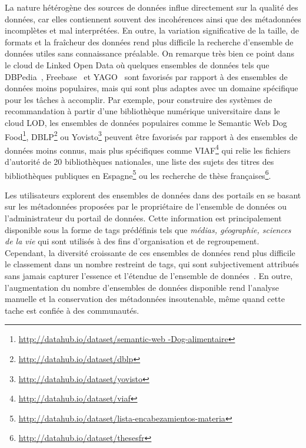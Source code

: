 La nature h\'{e}t\'{e}rog\`{e}ne des sources de donn\'{e}es influe directement sur la qualit\'{e} des donn\'{e}es, car elles contiennent souvent des incoh\'{e}rences ainsi que des m\'{e}tadonn\'{e}es incompl\`{e}tes et mal interpr\'{e}t\'{e}es. En outre, la variation significative de la taille, de formats et la fraîcheur des donn\'{e}es rend plus difficile la recherche d'ensemble de donn\'{e}es utiles sans connaissance pr\'{e}alable. On remarque tr\`{e}s bien ce point dans le cloud de Linked Open Data où quelques ensembles de donn\'{e}es tels que DBPedia~\cite{Bizer:WebSemJorunal:09}, Freebase~\cite{Bollacker:SIGMOD:08} et YAGO~\cite{Suchanek::WWW:07} sont favoris\'{e}s par rapport à des ensembles de donn\'{e}es moins populaires, mais qui sont plus adaptes avec un domaine sp\'{e}cifique pour les tâches à accomplir. Par exemple, pour construire des syst\`{e}mes de recommandation à partir d'une biblioth\`{e}que num\'{e}rique universitaire dans le cloud LOD, les ensembles de donn\'{e}es populaires comme le Semantic Web Dog Food\footnote{\url{http://datahub.io/dataset/semantic-web -Dog-alimentaire}}, DBLP\footnote{\url{http://datahub.io/dataset/dblp}} ou Yovisto\footnote{\url{http://datahub.io/dataset/yovisto}} peuvent être favoris\'{e}s par rapport à des ensembles de donn\'{e}es moins connus, mais plus sp\'{e}cifiques comme VIAF\footnote{\url{http://datahub.io/dataset/viaf}} qui relie les fichiers d'autorit\'{e} de 20 biblioth\`{e}ques nationales, une liste des sujets des titres des biblioth\`{e}ques publiques en Espagne\footnote{\url{http://datahub.io/dataset/lista-encabezamientos-materia}} ou les recherche de th\`{e}se françaises\footnote{\url{http://datahub.io/dataset/thesesfr}}.

Les utilisateurs explorent des ensembles de donn\'{e}es dans des portails en se basant sur les m\'{e}tadonn\'{e}es propos\'{e}es par le propri\'{e}taire de l'ensemble de donn\'{e}es ou l'administrateur du portail de donn\'{e}es. Cette information est principalement disponible sous la forme de tags pr\'{e}d\'{e}finis tels que \textit{m\'{e}dias, g\'{e}ographie, sciences de la vie} qui sont utilis\'{e}s à des fins d'organisation et de regroupement. Cependant, la diversit\'{e} croissante de ces ensembles de donn\'{e}es rend plus difficile le classement dans un nombre restreint de tags, qui sont subjectivement attribu\'{e}s sans jamais capturer l'essence et l'\'{e}tendue de l'ensemble de donn\'{e}es~\cite {Lalithsena:WI:13}. En outre, l'augmentation du nombre d'ensembles de donn\'{e}es disponible rend l'analyse manuelle et la conservation des m\'{e}tadonn\'{e}es insoutenable, même quand cette tache est confi\'{e}e à des communaut\'{e}s.

